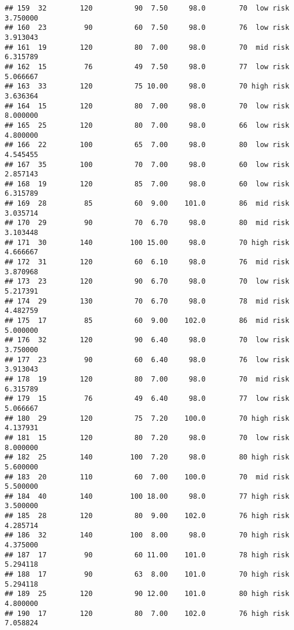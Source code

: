 \documentclass[
  ignorenonframetext,
]{beamer}
\begin{document}
\begin{frame}[fragile]
\begin{verbatim}
## 159  32        120          90  7.50     98.0        70  low risk      3.750000
## 160  23         90          60  7.50     98.0        76  low risk      3.913043
## 161  19        120          80  7.00     98.0        70  mid risk      6.315789
## 162  15         76          49  7.50     98.0        77  low risk      5.066667
## 163  33        120          75 10.00     98.0        70 high risk      3.636364
## 164  15        120          80  7.00     98.0        70  low risk      8.000000
## 165  25        120          80  7.00     98.0        66  low risk      4.800000
## 166  22        100          65  7.00     98.0        80  low risk      4.545455
## 167  35        100          70  7.00     98.0        60  low risk      2.857143
## 168  19        120          85  7.00     98.0        60  low risk      6.315789
## 169  28         85          60  9.00    101.0        86  mid risk      3.035714
## 170  29         90          70  6.70     98.0        80  mid risk      3.103448
## 171  30        140         100 15.00     98.0        70 high risk      4.666667
## 172  31        120          60  6.10     98.0        76  mid risk      3.870968
## 173  23        120          90  6.70     98.0        70  low risk      5.217391
## 174  29        130          70  6.70     98.0        78  mid risk      4.482759
## 175  17         85          60  9.00    102.0        86  mid risk      5.000000
## 176  32        120          90  6.40     98.0        70  low risk      3.750000
## 177  23         90          60  6.40     98.0        76  low risk      3.913043
## 178  19        120          80  7.00     98.0        70  mid risk      6.315789
## 179  15         76          49  6.40     98.0        77  low risk      5.066667
## 180  29        120          75  7.20    100.0        70 high risk      4.137931
## 181  15        120          80  7.20     98.0        70  low risk      8.000000
## 182  25        140         100  7.20     98.0        80 high risk      5.600000
## 183  20        110          60  7.00    100.0        70  mid risk      5.500000
## 184  40        140         100 18.00     98.0        77 high risk      3.500000
## 185  28        120          80  9.00    102.0        76 high risk      4.285714
## 186  32        140         100  8.00     98.0        70 high risk      4.375000
## 187  17         90          60 11.00    101.0        78 high risk      5.294118
## 188  17         90          63  8.00    101.0        70 high risk      5.294118
## 189  25        120          90 12.00    101.0        80 high risk      4.800000
## 190  17        120          80  7.00    102.0        76 high risk      7.058824

\end{verbatim}
\end{frame}
\end{document}
